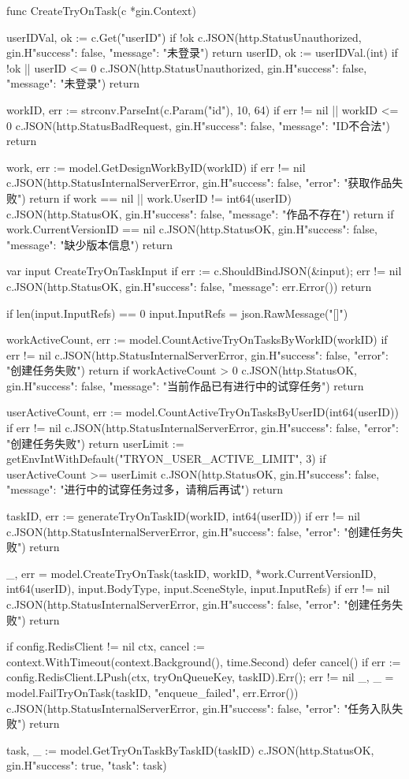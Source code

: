 \documentclass[twoside]{thesis-cls-Miya} %
\begin{document}
func CreateTryOnTask(c *gin.Context) {
	userIDVal, ok := c.Get("userID")
	if !ok {
		c.JSON(http.StatusUnauthorized, gin.H{"success": false, "message": "未登录"})
		return
	}
	userID, ok := userIDVal.(int)
	if !ok || userID <= 0 {
		c.JSON(http.StatusUnauthorized, gin.H{"success": false, "message": "未登录"})
		return
	}

	workID, err := strconv.ParseInt(c.Param("id"), 10, 64)
	if err != nil || workID <= 0 {
		c.JSON(http.StatusBadRequest, gin.H{"success": false, "message": "ID不合法"})
		return
	}

	work, err := model.GetDesignWorkByID(workID)
	if err != nil {
		c.JSON(http.StatusInternalServerError, gin.H{"success": false, "error": "获取作品失败"})
		return
	}
	if work == nil || work.UserID != int64(userID) {
		c.JSON(http.StatusOK, gin.H{"success": false, "message": "作品不存在"})
		return
	}
	if work.CurrentVersionID == nil {
		c.JSON(http.StatusOK, gin.H{"success": false, "message": "缺少版本信息"})
		return
	}

	var input CreateTryOnTaskInput
	if err := c.ShouldBindJSON(&input); err != nil {
		c.JSON(http.StatusOK, gin.H{"success": false, "message": err.Error()})
		return
	}

	if len(input.InputRefs) == 0 {
		input.InputRefs = json.RawMessage("[]")
	}

	workActiveCount, err := model.CountActiveTryOnTasksByWorkID(workID)
	if err != nil {
		c.JSON(http.StatusInternalServerError, gin.H{"success": false, "error": "创建任务失败"})
		return
	}
	if workActiveCount > 0 {
		c.JSON(http.StatusOK, gin.H{"success": false, "message": "当前作品已有进行中的试穿任务"})
		return
	}

	userActiveCount, err := model.CountActiveTryOnTasksByUserID(int64(userID))
	if err != nil {
		c.JSON(http.StatusInternalServerError, gin.H{"success": false, "error": "创建任务失败"})
		return
	}
	userLimit := getEnvIntWithDefault("TRYON_USER_ACTIVE_LIMIT", 3)
	if userActiveCount >= userLimit {
		c.JSON(http.StatusOK, gin.H{"success": false, "message": "进行中的试穿任务过多，请稍后再试"})
		return
	}

	taskID, err := generateTryOnTaskID(workID, int64(userID))
	if err != nil {
		c.JSON(http.StatusInternalServerError, gin.H{"success": false, "error": "创建任务失败"})
		return
	}

	_, err = model.CreateTryOnTask(taskID, workID, *work.CurrentVersionID, int64(userID), input.BodyType, input.SceneStyle, input.InputRefs)
	if err != nil {
		c.JSON(http.StatusInternalServerError, gin.H{"success": false, "error": "创建任务失败"})
		return
	}

	if config.RedisClient != nil {
		ctx, cancel := context.WithTimeout(context.Background(), time.Second)
		defer cancel()
		if err := config.RedisClient.LPush(ctx, tryOnQueueKey, taskID).Err(); err != nil {
			_, _ = model.FailTryOnTask(taskID, "enqueue_failed", err.Error())
			c.JSON(http.StatusInternalServerError, gin.H{"success": false, "error": "任务入队失败"})
			return
		}
	}

	task, _ := model.GetTryOnTaskByTaskID(taskID)
	c.JSON(http.StatusOK, gin.H{"success": true, "task": task})
}
\end{document}
